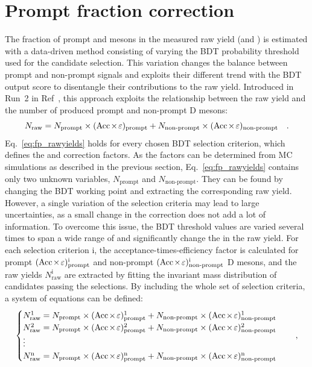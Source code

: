 \section{Prompt fraction correction}
The fraction of prompt \ds and \dpl mesons in the measured raw yield (\fpds and \fpdpl) is estimated with a data-driven method consisting of varying the BDT probability threshold used for the candidate selection. This variation changes the balance between prompt and non-prompt signals and exploits their different trend with the BDT output score to disentangle their contributions to the raw yield. Introduced in Run~2 in Ref~\cite{ALICE:2021mgk}, this approach exploits the relationship between the raw yield and the number of produced prompt and non-prompt D mesons:
\begin{equation}\label{eq:fp_rawyields}
    N_\mathrm{raw} = N_\mathrm{prompt}\times(\mathrm{Acc}\mkern-2mu\times\mkern-2mu\varepsilon)_\mathrm{prompt} + N_\mathrm{non\text{-}prompt} \times (\mathrm{Acc}\mkern-2mu\times\mkern-2mu\varepsilon)_\mathrm{non\text{-}prompt}\quad .
\end{equation}
\vspace{0.1cm}
Eq.~\ref{eq:fp_rawyields} holds for every chosen BDT selection criterion, which defines the \aeffp and \aeffnp correction factors. As the \aeff factors can be determined from MC simulations as described in the previous section, Eq.~\ref{eq:fp_rawyields} contains only two unknown variables, $N_\mathrm{prompt}$ and $N_\mathrm{non\text{-}prompt}$. They can be found by changing the BDT working point and extracting the corresponding raw yield. However, a single variation of the selection criteria may lead to large uncertainties, as a small change in the \aeff correction does not add a lot of information. To overcome this issue, the BDT threshold values are varied several times to span a wide range of \aeffp and significantly change the \fp in the raw yield. For each selection criterion i, the acceptance-times-efficiency factor is calculated for prompt $(\mathrm{Acc}\mkern-2mu\times\mkern-2mu\varepsilon)_\mathrm{prompt}^\mathrm{i}$ and non-prompt $(\mathrm{Acc}\mkern-2mu\times\mkern-2mu\varepsilon)_\mathrm{non\text{-}prompt}^\mathrm{i}$ D mesons, and the raw yields $N_\mathrm{raw}^\mathrm{i}$ are extracted by fitting the invariant mass distribution of candidates passing the selections. By including the whole set of selection criteria, a system of equations can be defined:
\begin{equation*}
    \begin{cases}
        N_\mathrm{raw}^1 = N_\mathrm{prompt}\times(\mathrm{Acc}\mkern-2mu\times\mkern-2mu\varepsilon)_\mathrm{prompt}^1 + N_\mathrm{non\text{-}prompt} \times (\mathrm{Acc}\mkern-2mu\times\mkern-2mu\varepsilon)_\mathrm{non\text{-}prompt}^1\\
        N_\mathrm{raw}^2 = N_\mathrm{prompt}\times(\mathrm{Acc}\mkern-2mu\times\mkern-2mu\varepsilon)_\mathrm{prompt}^2 + N_\mathrm{non\text{-}prompt} \times (\mathrm{Acc}\mkern-2mu\times\mkern-2mu\varepsilon)_\mathrm{non\text{-}prompt}^2\\
        \vdots\\
        N_\mathrm{raw}^\mathrm{n} = N_\mathrm{prompt}\times(\mathrm{Acc}\mkern-2mu\times\mkern-2mu\varepsilon)_\mathrm{prompt}^\mathrm{n} + N_\mathrm{non\text{-}prompt} \times (\mathrm{Acc}\mkern-2mu\times\mkern-2mu\varepsilon)_\mathrm{non\text{-}prompt}^\mathrm{n}
    \end{cases}
    \quad ,
\end{equation*}
